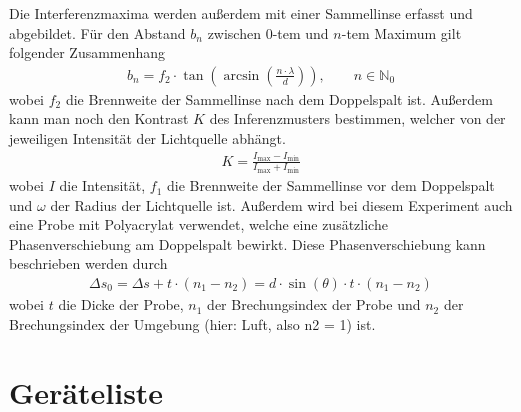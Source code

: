 \documentclass{article}
\begin{document}
Die Interferenzmaxima werden außerdem mit einer Sammellinse erfasst und abgebildet. Für den Abstand $b_n$ zwischen $0$-tem und $n$-tem Maximum gilt folgender Zusammenhang 
\begin{align}
b_n = f_2 \cdot \tan\left( \operatorname{arcsin}\left(\frac{n\cdot\lambda}{d}\right)\right), \qquad n\in\mathbb{N}_0
\end{align}
wobei $f_2$ die Brennweite der Sammellinse nach dem Doppelspalt ist. Außerdem kann man noch den Kontrast $K$ des Inferenzmusters bestimmen, welcher von der jeweiligen Intensität der Lichtquelle abhängt.
\begin{align}
K = \frac{I_\text{max}-I_\text{min}}{I_\text{max}+I_\text{min}} \label{eq:kontrast}
\end{align}
wobei $I$ die Intensität, $f_1$ die Brennweite der Sammellinse vor dem Doppelspalt und $\omega$ der Radius der Lichtquelle ist. Außerdem wird bei diesem Experiment auch eine Probe mit Polyacrylat verwendet, welche eine zusätzliche Phasenverschiebung am Doppelspalt bewirkt. Diese Phasenverschiebung kann beschrieben werden durch
\begin{align}
\Delta s_0 = \Delta s + t\cdot (n_1-n_2) = d\cdot\sin(\theta)\cdot t\cdot (n_1-n_2)
\end{align}
wobei $t$ die Dicke der Probe, $n_1$ der Brechungsindex der Probe und $n_2$ der Brechungsindex der Umgebung (hier: Luft, also n2 = 1) ist.







\section{Geräteliste}
\end{document}
